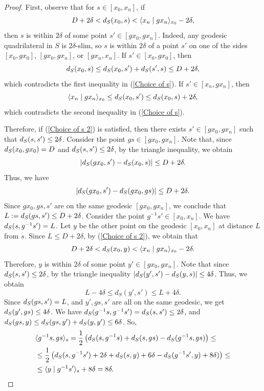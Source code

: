 \documentclass[10pt,a4paper]{amsart}
\renewcommand{\d}{{\rm d}}
\begin{document}
\begin{proof}
First, observe that for $s \in [x_0, x_n]$, if 
\begin{equation}\label{Choice of s}
D+2\delta < \d_S(x_0, s) < \langle x_n \mid gx_n \rangle_{x_0}- 2\delta,
\end{equation}
then $s$ is within $2\delta$ of some point $s' \in [gx_0,gx_n]$. Indeed, any geodesic quadrilateral in $S$ is $2\delta$-slim, so $s$ is within $2\delta$ of a point $s'$ on one of the sides $[x_0,gx_0]$, $[gx_0,gx_n]$, or $[gx_n,x_n]$.
If $s' \in [x_0, gx_0]$, then $$
\d_S(x_0,s) \leq \d_S(x_0,s')+\d_S(s',s) \leq D+2\delta,$$
which contradicts the first inequality in (\ref{Choice of s}).
If $s' \in [x_n, gx_n]$, then $$
\langle x_n \mid gx_n \rangle_{x_0} \leq \d_S(x_0, s') \leq \d_S(x_0,s)+2\delta,
$$ which contradicts the second inequality in (\ref{Choice of s}).

Therefore, if (\ref{Choice of s 2}) is satisfied, then there exists $s' \in [gx_0, gx_n]$ such that $\d_S(s, s') \leq 2\delta$. Consider the point $gs \in [gx_0, gx_n]$.
Note that, since $\d_S(x_0, gx_0) = D$ and $\d_S(s, s') \leq 2\delta$, by the triangle inequality, we obtain
$$
|\d_S(gx_0, s') - \d_S(x_0, s)| \leq D+2\delta.
$$
Thus, we have
$$
|\d_S(gx_0, s') - \d_S(gx_0,gs)| \leq D+2\delta.
$$
Since $gx_0, gs, s'$ are on the same geodesic $[gx_0, gx_n]$, we conclude that $L := \d_S(gs, s') \leq D+ 2\delta$. 
Consider the point $g^{-1}s' \in [x_0, x_n]$. We have $\d_S(s, g^{-1}s')=L$. Let $y$ be the other point on the geodesic $[x_0, x_n]$ at distance $L$ from $s$. Since $L\leq D+ 2\delta$, by (\ref{Choice of s 2}), we obtain that
$$
D+2\delta < \d_S(x_0, y) < \langle x_n \mid gx_n \rangle_{x_0}- 2\delta.
$$
Therefore, $y$ is within $2\delta$ of some point $y' \in [gx_0, gx_n]$.
Note that since $\d_S(s, s')\leq 2\delta$, by the triangle inequality
$|\d_S(y', s') - \d_S(y,s)| \leq 4\delta$.
Thus, we obtain
$$
L-4\delta \leq d_S(y', s') \leq L+4\delta.
$$
Since $\d_S(gs, s') =L$, and $y', gs, s'$ are all on the same geodesic, we get
$\d_S(y', gs) \leq 4\delta$.
We have $\d_S(g^{-1}s, g^{-1}s')=\d_S(s, s') \leq 2\delta$,
and $d_S(gs, y) \leq \d_S(gs, y')+\d_S(y, y') \leq 6\delta$.
So,
$$ 
\begin{aligned}
&\langle g^{-1}s, gs\rangle_s= \frac{1}{2}\left(\d_S(s, g^{-1}s)+\d_S(s, gs)-\d_S(g^{-1}s, gs)\right)\leq \\
&\leq \frac{1}{2}\left(\d_S(s, g^{-1}s')+2\delta
+ \d_S(s,y)+6\delta -\d_S(g^{-1}s', y)+8\delta)\right) \leq\\
&\leq \langle y \mid g^{-1}s'\rangle_s + 8\delta = 8\delta.
\end{aligned}
$$
\end{proof}
\end{document}
